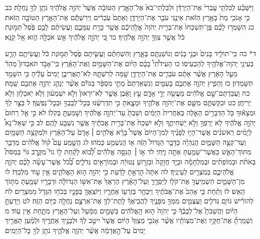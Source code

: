 \documentclass[twoside, openany, parskip=half, 11pt]{book}
\begin{document}
וַיִּשָּׁבַ֗ע לְבִלְתִּ֤י עׇבְרִי֙ אֶת־הַיַּרְדֵּ֔ן וּלְבִלְתִּי־בֹא֙ אֶל־הָאָ֣רֶץ הַטּוֹבָ֔ה אֲשֶׁר֙ יְהֹוָ֣ה אֱלֹהֶ֔יךָ נֹתֵ֥ן לְךָ֖ נַחֲלָֽה׃ כב כִּ֣י אָנֹכִ֥י מֵת֙ בָּאָ֣רֶץ הַזֹּ֔את אֵינֶ֥נִּי עֹבֵ֖ר אֶת־הַיַּרְדֵּ֑ן וְאַתֶּם֙ עֹֽבְרִ֔ים וִֽירִשְׁתֶּ֕ם אֶת־הָאָ֥רֶץ הַטּוֹבָ֖ה הַזֹּֽאת׃ כג הִשָּׁמְר֣וּ לָכֶ֗ם פֶּֽן־תִּשְׁכְּחוּ֙ אֶת־בְּרִ֤ית יְהֹוָה֙ אֱלֹ֣הֵיכֶ֔ם אֲשֶׁ֥ר כָּרַ֖ת עִמָּכֶ֑ם וַעֲשִׂיתֶ֨ם לָכֶ֥ם פֶּ֙סֶל֙ תְּמ֣וּנַת כֹּ֔ל אֲשֶׁ֥ר צִוְּךָ֖ יְהֹוָ֥ה אֱלֹהֶֽיךָ׃ כד כִּ֚י יְהֹוָ֣ה אֱלֹהֶ֔יךָ אֵ֥שׁ אֹכְלָ֖ה ה֑וּא אֵ֖ל קַנָּֽא׃

ד* כה כִּֽי־תוֹלִ֤יד בָּנִים֙ וּבְנֵ֣י בָנִ֔ים וְנוֹשַׁנְתֶּ֖ם בָּאָ֑רֶץ וְהִשְׁחַתֶּ֗ם וַעֲשִׂ֤יתֶם פֶּ֙סֶל֙ תְּמ֣וּנַת כֹּ֔ל וַעֲשִׂיתֶ֥ם הָרַ֛ע בְּעֵינֵ֥י יְהֹוָה־אֱלֹהֶ֖יךָ לְהַכְעִיסֽוֹ׃ כו הַעִידֹ֩תִי֩ בָכֶ֨ם הַיּ֜וֹם אֶת־הַשָּׁמַ֣יִם וְאֶת־הָאָ֗רֶץ כִּֽי־אָבֹ֣ד תֹּאבֵדוּן֮ מַהֵר֒ מֵעַ֣ל הָאָ֔רֶץ אֲשֶׁ֨ר אַתֶּ֜ם עֹבְרִ֧ים אֶת־הַיַּרְדֵּ֛ן שָׁ֖מָּה לְרִשְׁתָּ֑הּ לֹֽא־תַאֲרִיכֻ֤ן יָמִים֙ עָלֶ֔יהָ כִּ֥י הִשָּׁמֵ֖ד תִּשָּׁמֵדֽוּן׃ כז וְהֵפִ֧יץ יְהֹוָ֛ה אֶתְכֶ֖ם בָּעַמִּ֑ים וְנִשְׁאַרְתֶּם֙ מְתֵ֣י מִסְפָּ֔ר בַּגּוֹיִ֕ם אֲשֶׁ֨ר יְנַהֵ֧ג יְהֹוָ֛ה אֶתְכֶ֖ם שָֽׁמָּה׃ כח וַעֲבַדְתֶּם־שָׁ֣ם אֱלֹהִ֔ים מַעֲשֵׂ֖ה יְדֵ֣י אָדָ֑ם עֵ֣ץ וָאֶ֔בֶן אֲשֶׁ֤ר לֹֽא־יִרְאוּן֙ וְלֹ֣א יִשְׁמְע֔וּן וְלֹ֥א יֹֽאכְל֖וּן וְלֹ֥א יְרִיחֻֽן׃ כט וּבִקַּשְׁתֶּ֥ם מִשָּׁ֛ם אֶת־יְהֹוָ֥ה אֱלֹהֶ֖יךָ וּמָצָ֑אתָ כִּ֣י תִדְרְשֶׁ֔נּוּ בְּכׇל־לְבָבְךָ֖ וּבְכׇל־נַפְשֶֽׁךָ׃ ל בַּצַּ֣ר לְךָ֔ וּמְצָא֕וּךָ כֹּ֖ל הַדְּבָרִ֣ים הָאֵ֑לֶּה בְּאַחֲרִית֙ הַיָּמִ֔ים וְשַׁבְתָּ֙ עַד־יְהֹוָ֣ה אֱלֹהֶ֔יךָ וְשָׁמַעְתָּ֖ בְּקֹלֽוֹ׃ לא כִּ֣י אֵ֤ל רַחוּם֙ יְהֹוָ֣ה אֱלֹהֶ֔יךָ לֹ֥א יַרְפְּךָ֖ וְלֹ֣א יַשְׁחִיתֶ֑ךָ וְלֹ֤א יִשְׁכַּח֙ אֶת־בְּרִ֣ית אֲבֹתֶ֔יךָ אֲשֶׁ֥ר נִשְׁבַּ֖ע לָהֶֽם׃ לב כִּ֣י שְׁאַל־נָא֩ לְיָמִ֨ים רִֽאשֹׁנִ֜ים אֲשֶׁר־הָי֣וּ לְפָנֶ֗יךָ לְמִן־הַיּוֹם֙ אֲשֶׁר֩ בָּרָ֨א אֱלֹהִ֤ים ׀ אָדָם֙ עַל־הָאָ֔רֶץ וּלְמִקְצֵ֥ה הַשָּׁמַ֖יִם וְעַד־קְצֵ֣ה הַשָּׁמָ֑יִם הֲנִֽהְיָ֗ה כַּדָּבָ֤ר הַגָּדוֹל֙ הַזֶּ֔ה א֖וֹ הֲנִשְׁמַ֥ע כָּמֹֽהוּ׃ לג הֲשָׁ֣מַֽע עָם֩ ק֨וֹל אֱלֹהִ֜ים מְדַבֵּ֧ר מִתּוֹךְ־הָאֵ֛שׁ כַּאֲשֶׁר־שָׁמַ֥עְתָּ אַתָּ֖ה וַיֶּֽחִי׃ לד א֣וֹ ׀ הֲנִסָּ֣ה אֱלֹהִ֗ים לָ֠ב֠וֹא לָקַ֨חַת ל֣וֹ גוֹי֮ מִקֶּ֣רֶב גּוֹי֒ בְּמַסֹּת֩ בְּאֹתֹ֨ת וּבְמוֹפְתִ֜ים וּבְמִלְחָמָ֗ה וּבְיָ֤ד חֲזָקָה֙ וּבִזְר֣וֹעַ נְטוּיָ֔ה וּבְמוֹרָאִ֖ים גְּדֹלִ֑ים כְּ֠כֹ֠ל אֲשֶׁר־עָשָׂ֨ה לָכֶ֜ם יְהֹוָ֧ה אֱלֹהֵיכֶ֛ם בְּמִצְרַ֖יִם לְעֵינֶֽיךָ׃ לה אַתָּה֙ הׇרְאֵ֣תָ לָדַ֔עַת כִּ֥י יְהֹוָ֖ה ה֣וּא הָאֱלֹהִ֑ים אֵ֥ין ע֖וֹד מִלְּבַדּֽוֹ׃ לו מִן־הַשָּׁמַ֛יִם הִשְׁמִֽיעֲךָ֥ אֶת־קֹל֖וֹ לְיַסְּרֶ֑ךָּ וְעַל־הָאָ֗רֶץ הֶרְאֲךָ֙ אֶת־אִשּׁ֣וֹ הַגְּדוֹלָ֔ה וּדְבָרָ֥יו שָׁמַ֖עְתָּ מִתּ֥וֹךְ הָאֵֽשׁ׃ לז וְתַ֗חַת כִּ֤י אָהַב֙ אֶת־אֲבֹתֶ֔יךָ וַיִּבְחַ֥ר בְּזַרְע֖וֹ אַחֲרָ֑יו וַיּוֹצִֽאֲךָ֧ בְּפָנָ֛יו בְּכֹח֥וֹ הַגָּדֹ֖ל מִמִּצְרָֽיִם׃ לח לְהוֹרִ֗ישׁ גּוֹיִ֛ם גְּדֹלִ֧ים וַעֲצֻמִ֛ים מִמְּךָ֖ מִפָּנֶ֑יךָ לַהֲבִֽיאֲךָ֗ לָֽתֶת־לְךָ֧ אֶת־אַרְצָ֛ם נַחֲלָ֖ה כַּיּ֥וֹם הַזֶּֽה׃ לט וְיָדַעְתָּ֣ הַיּ֗וֹם וַהֲשֵׁבֹתָ֮ אֶל־לְבָבֶ֒ךָ֒ כִּ֤י יְהֹוָה֙ ה֣וּא הָֽאֱלֹהִ֔ים בַּשָּׁמַ֣יִם מִמַּ֔עַל וְעַל־הָאָ֖רֶץ מִתָּ֑חַת אֵ֖ין עֽוֹד׃ מ וְשָׁמַרְתָּ֞ אֶת־חֻקָּ֣יו וְאֶת־מִצְוֺתָ֗יו אֲשֶׁ֨ר אָנֹכִ֤י מְצַוְּךָ֙ הַיּ֔וֹם אֲשֶׁר֙ יִיטַ֣ב לְךָ֔ וּלְבָנֶ֖יךָ אַחֲרֶ֑יךָ וּלְמַ֨עַן תַּאֲרִ֤יךְ יָמִים֙ עַל־הָ֣אֲדָמָ֔ה אֲשֶׁ֨ר יְהֹוָ֧ה אֱלֹהֶ֛יךָ נֹתֵ֥ן לְךָ֖ כׇּל־הַיָּמִֽים׃
\end{document}
